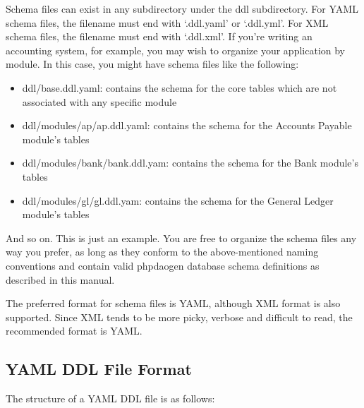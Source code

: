 \documentclass[letterpaper,10pt,english]{sphinxmanual}
\begin{document}
Schema files can exist in any subdirectory under the ddl subdirectory.  For YAML schema files, the
filename must end with `.ddl.yaml' or `.ddl.yml'.  For XML schema files, the filename must end with
`.ddl.xml'.  If you're writing an accounting system, for example, you may wish to organize your
application by module.  In this case, you might have schema files like the following:
\begin{itemize}
\item {} 
ddl/base.ddl.yaml: contains the schema for the core tables which are not associated with any
specific module

\item {} 
ddl/modules/ap/ap.ddl.yaml: contains the schema for the Accounts Payable module's tables

\item {} 
ddl/modules/bank/bank.ddl.yam: contains the schema for the Bank module's tables

\item {} 
ddl/modules/gl/gl.ddl.yam: contains the schema for the General Ledger module's tables

\end{itemize}

And so on.  This is just an example.  You are free to organize the schema files any way you prefer,
as long as they conform to the above-mentioned naming conventions and contain valid phpdaogen
database schema definitions as described in this manual.

The preferred format for schema files is YAML, although XML format is also supported.  Since XML
tends to be more picky, verbose and difficult to read, the recommended format is YAML.


\subsection{YAML DDL File Format}
\label{jaxFrameworkGuide:yaml-ddl-file-format}
The structure of a YAML DDL file is as follows:
\end{document}
